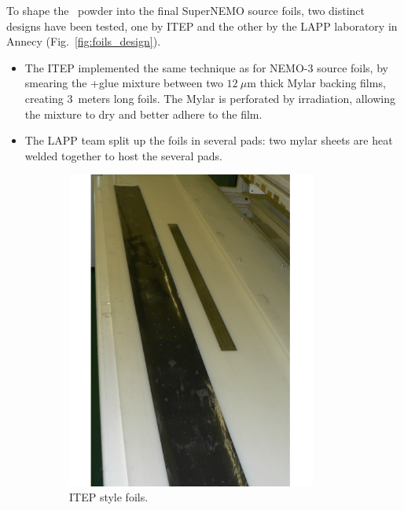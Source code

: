 To shape the \Se\ powder into the final SuperNEMO source foils, two distinct designs have been tested, one by ITEP and the other by the LAPP laboratory in Annecy (Fig.~\ref{fig:foils_design}).
\begin{itemize}
\item The ITEP implemented the same technique as for NEMO-$3$ source foils, by smearing the \Se+glue mixture between two $12~\mu$m thick Mylar backing films, creating $3$~meters long foils.
The Mylar is perforated by irradiation, allowing the mixture to dry and better adhere to the film.
\item The LAPP team split up the foils in several pads: two mylar sheets are heat welded together to host the several pads.
\end{itemize}
\begin{figure}[h!]
\centering
\begin{subfigure}[t]{0.49\textwidth}
\centering
\includegraphics[width=0.9\textwidth]{SNdemonstrator/fig_SNdemonstrator/ITEP_source_foils.png}
\captionsetup{justification=centering}
\caption{ITEP style foils.
\label{subfig:ITEP_foils}}
\end{subfigure}
\hfill
\begin{subfigure}[t]{0.49\textwidth}

\end{subfigure}
\end{figure}
